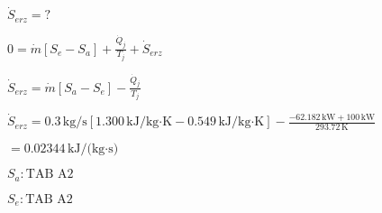 \( \dot{S}_{erz} = ? \)  

\( 0 = \dot{m} \left[ S_e - S_a \right] + \frac{\dot{Q}_j}{T_j} + \dot{S}_{erz} \)  

\( \dot{S}_{erz} = \dot{m} \left[ S_a - S_e \right] - \frac{\dot{Q}_j}{T_j} \)  

\( \dot{S}_{erz} = 0.3 \, \text{kg/s} \left[ 1.300 \, \text{kJ/kg·K} - 0.549 \, \text{kJ/kg·K} \right] - \frac{-62.182 \, \text{kW} + 100 \, \text{kW}}{293.72 \, \text{K}} \)  

\( = 0.02344 \, \text{kJ/(kg·s)} \)  

\( S_a: \text{TAB A2} \)  

\( S_e: \text{TAB A2} \)